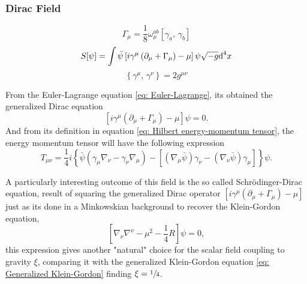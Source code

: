 \subsubsection{Dirac Field}
\begin{equation}
	\Gamma_\mu=\frac{1}{8}\omega_{\mu}^{ab}\left[\gamma_a,\,\gamma_b\right]
\end{equation}
\begin{equation}
	S[\psi]=\int \bar{\psi}\left[i\gamma^\mu\left(\partial_\mu+\Gamma_\mu\right)-\mu\right]\psi\sqrt{-g}\text{d}^4x
\end{equation}
\begin{equation}
	\left\{\gamma^\mu,\,\gamma^\nu\right\}=2g^{\mu\nu}
\end{equation}

From the Euler-Lagrange equation \ref{eq: Euler-Lagrange}, its obtained the generalized Dirac equation
\begin{equation}
	\left[i\gamma^\mu\left(\partial_\mu+\Gamma_\mu\right)-\mu\right]\psi=0.
\end{equation}
And from its definition in equation \ref{eq: Hilbert energy-momentum tensor}, the energy momentum tensor will have the following expression
\begin{equation}
	T_{\mu\nu}=\frac{1}{4}i\left\{\bar{\psi}\left(\gamma_\mu\nabla_\nu-\gamma_\nu\nabla_\mu\right)-\left[\left(\nabla_\mu\bar{\psi}\right)\gamma_\nu-\left(\nabla_\nu\bar{\psi}\right)\gamma_\mu\right]\right\}\psi.
\end{equation}

A particularly interesting outcome of this field is the so called Schrödinger-Dirac equation, result of squaring the generalized Dirac operator $\left[i\gamma^\mu\left(\partial_\mu+\Gamma_\mu\right)-\mu\right]$ just as its done in a Minkowskian background to recover the Klein-Gordon equation,
\begin{equation}
	\left[\nabla_\nu\nabla^\nu-\mu^2-\frac{1}{4}R\right]\psi=0,
\end{equation}
this expression gives another "natural" choice for the scalar field coupling to gravity $\xi$, comparing it with the generalized Klein-Gordon equation \ref{eq: Generalized Klein-Gordon} finding $\xi=\sfrac{1}{4}$.

